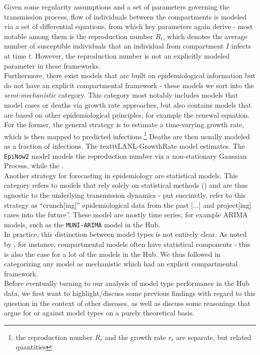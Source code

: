 Given some regularity assumptions and a set of parameters governing the transmission process, flow of individuals between the compartments is modeled via a set of differential equations, from which key parameters again derive - most notable among them is the reproduction number $R_t$, which denotes the average number of susceptible individuals that an individual from compartment $I$ infects at time $t$. However, the reproduction number is not an explicitly modeled parameter in these frameworks.\\
Furthermore, there exist models that are built on epidemiological information but do not have an explicit compartmental framework - these models we sort into the \textit{semi-mechanistic} category. This category most notably includes models that model cases or deaths via growth rate approaches, but also contains models that are based on other epidemiological principles, for example the renewal equation. For the former, the general strategy is to estimate a time-varying growth rate, which is then mapped to predicted infections.\footnote{the reproduction number $R_t$ and the growth rate $r_t$ are separate, but related quantities} Deaths are then usually modeled as a fraction of infections. The texttt{LANL-GrowthRate} model estimates. The \texttt{EpiNow2} model models the reproduction number via a non-stationary Gaussian Process,  while the . \\
Another strategy for forecasting in epidemiology are statistical models. %
This category refers to models that rely solely on statistical methods () and are thus agnostic to the underlying transmission dynamics - put succinctly, \cite{holmdahl_wrong_2020} refer to this strategy as ``crunch[ing]'' epidemiological data from the past [...] and project[ing] cases into the future''. These model are mostly time series, for example ARIMA models, such as the \texttt{MUNI-ARIMA} model in the Hub.\\
In practice, this distinction between model types is not entirely clear. As noted by \cite{reich_collaborative_2019}, for instance, compartmental models often have statistical components - this is also the case for a lot  of the models in the Hub. We thus followed \cite{reich_collaborative_2019} in categorizing any model as mechanistic which had an explicit compartmental framework.\\
Before eventually turning to our analysis of model type performance in the Hub data, we first want to highlight/discuss some previous findings with regard to this question in the context of other diseases, as well as discuss some reasonings that argue for or against model types on a purely theoretical basis.\\
